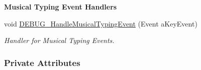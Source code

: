 \begin{Indent}\textbf{ Musical Typing Event Handlers}\par
\begin{DoxyCompactItemize}
\item 
void \hyperlink{group___audio_testing_ga3a8d2d91b97d0541c8a509e5785e9bdf}{D\+E\+B\+U\+G\+\_\+\+Handle\+Musical\+Typing\+Event} (Event a\+Key\+Event)
\begin{DoxyCompactList}\small\item\em Handler for Musical Typing Events. \end{DoxyCompactList}\end{DoxyCompactItemize}
\end{Indent}
\subsubsection*{Private Attributes}
